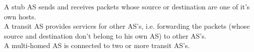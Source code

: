 A stub AS sends and receives packets whose source or destination are one of it's own hosts. \\
A transit AS provides services for other AS's, i.e. forwarding the packets (whose source and destination don't belong to his own AS) to other AS's. \\
A multi-homed AS is connected to two or more transit AS's.